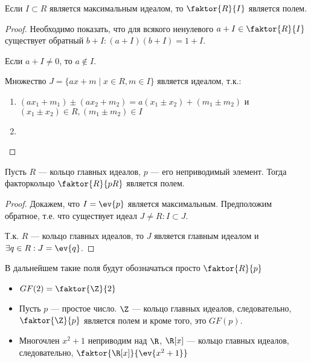 \begin{theorem}
    Если \(I \subset R\) является максимальным идеалом,
    то \(\faktor{R}{I}\) является полем.
\end{theorem}
\begin{proof}
    Необходимо показать, что для всякого ненулевого \(a + I \in \faktor{R}{I}\)
    существует обратный \(b + I : (a + I)(b + I) = 1 + I\).
    
    Если \(a + I \neq 0\), то \(a \notin I\).
    
    Множество \(J = \{ax + m \mid x \in R, m \in I\}\) является идеалом,
    т.к.:
    \begin{enumerate}
        \item \((ax_1 + m_1) \pm (ax_2 + m_2) = a(x_1 \pm x_2) + (m_1 \pm m_2)
        \) и \((x_1 \pm x_2) \in R, (m_1 \pm m_2) \in I\)
        \item \unfinished
    \end{enumerate}
    
    \unfinished
\end{proof}

\begin{theorem}
    Пусть \(R\) --- кольцо главных идеалов, \(p\) --- его неприводимый элемент.
    Тогда факторкольцо \(\faktor{R}{pR}\) является полем.
\end{theorem}
\begin{proof}
    Докажем, что \(I = \ev{p}\) является максимальным.
    Предположим обратное, т.е. что существует идеал \(J \neq R : I \subset J\).
    
    Т.к. \(R\) --- кольцо главных идеалов, то \(J\) является главным идеалом
    и \(\exists q \in R : J = \ev{q}\). \unfinished 
\end{proof}

В дальнейшем такие поля будут обозначаться просто \(\faktor{R}{p}\)

\begin{example}\itemfix
    \begin{itemize}
        \item \(GF(2) = \faktor{\Z}{2}\)
        \item Пусть \(p\) --- простое число. \(\Z\) --- кольцо главных идеалов,
        следовательно, \(\faktor{\Z}{p}\) является полем
        и кроме того, это \(GF(p)\).
        \item Многочлен \(x^2 + 1\) неприводим над \(\R\), \(\R[x]\) --- кольцо
        главных идеалов, следовательно, \(\faktor{\R[x]}{\ev{x^2 + 1}}\)
        \unfinished
    \end{itemize}
\end{example}

